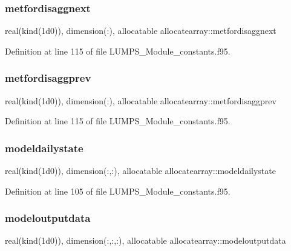 \subsubsection{\texorpdfstring{metfordisaggnext}{metfordisaggnext}}
{\footnotesize\ttfamily real(kind(1d0)), dimension(\+:), allocatable allocatearray\+::metfordisaggnext}



Definition at line 115 of file L\+U\+M\+P\+S\+\_\+\+Module\+\_\+constants.\+f95.

\mbox{\label{namespaceallocatearray_a6bed79ef5fd9afaa05e43813c8bdee75}} 
\subsubsection{\texorpdfstring{metfordisaggprev}{metfordisaggprev}}
{\footnotesize\ttfamily real(kind(1d0)), dimension(\+:), allocatable allocatearray\+::metfordisaggprev}



Definition at line 115 of file L\+U\+M\+P\+S\+\_\+\+Module\+\_\+constants.\+f95.

\mbox{\label{namespaceallocatearray_aa7293bcc78f5a7d94634e14eeabaa810}} 
\subsubsection{\texorpdfstring{modeldailystate}{modeldailystate}}
{\footnotesize\ttfamily real(kind(1d0)), dimension(\+:,\+:), allocatable allocatearray\+::modeldailystate}



Definition at line 105 of file L\+U\+M\+P\+S\+\_\+\+Module\+\_\+constants.\+f95.

\mbox{\label{namespaceallocatearray_a24801c67e9fc5e31774d0495327b964a}} 
\subsubsection{\texorpdfstring{modeloutputdata}{modeloutputdata}}
{\footnotesize\ttfamily real(kind(1d0)), dimension(\+:,\+:,\+:), allocatable allocatearray\+::modeloutputdata}



